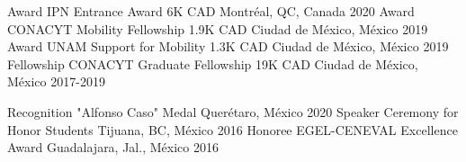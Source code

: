 \vspace{-5mm}
\begin{minipage}[t]{0.5\textwidth}
\begin{center}
\begin{cvhonors}
    \cvhonor
    {Award}
    {IPN Entrance Award 6K CAD}
    {Montréal, QC, Canada}
    {2020}
    \cvhonor
    {Award}
    {CONACYT Mobility Fellowship \approx1.9K CAD}
    {Ciudad de México, México}
    {2019}
    \cvhonor
    {Award}
    {UNAM Support for Mobility \approx1.3K CAD}
    {Ciudad de México, México}
    {2019}
    \cvhonor
    {Fellowship}
    {CONACYT Graduate Fellowship \approx19K CAD}
    {Ciudad de México, México}
    {2017-2019}
\end{cvhonors}
\end{center}
\end{minipage}
\begin{minipage}[t]{0.5\textwidth}
\begin{center}
\begin{cvhonors}
  \cvhonor
    {Recognition}
    {"Alfonso Caso" Medal}
    {Querétaro, México}
    {2020}
  \cvhonor
    {Speaker}
    {Ceremony for Honor Students}
    {Tijuana, BC, México}
    {2016}
  \cvhonor
    {Honoree}
    {EGEL-CENEVAL Excellence Award}
    {Guadalajara, Jal., México}
    {2016}
\end{cvhonors}
\end{center}
\end{minipage}
